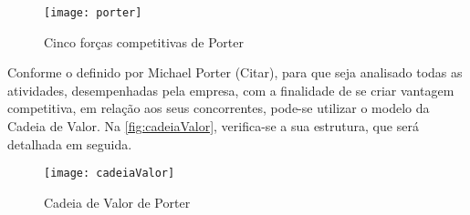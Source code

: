 \begin{figure}[htb]
	\caption{\label{fig:porter}Cinco forças competitivas de Porter}
	\begin{center}
	    \texttt{[image: porter]}
	\end{center}
\end{figure}

Conforme o definido por Michael Porter (Citar), para que seja analisado todas as atividades, desempenhadas pela empresa, com a finalidade de se criar vantagem competitiva, em relação aos seus concorrentes, pode-se utilizar o modelo da Cadeia de Valor. Na \autoref{fig:cadeiaValor}, verifica-se a sua estrutura, que será detalhada em seguida.

\begin{figure}[htb]
	\caption{\label{fig:cadeiaValor}Cadeia de Valor de Porter}
	\begin{center}
	    \texttt{[image: cadeiaValor]}
	\end{center}
\end{figure}

